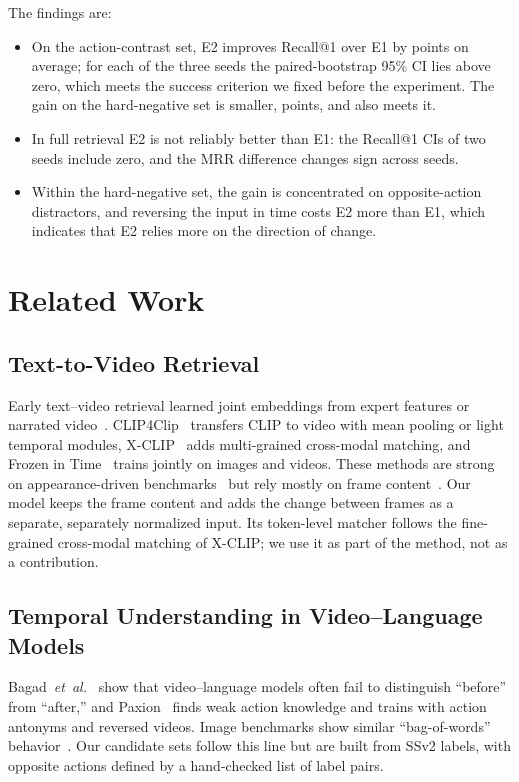 \documentclass[lettersize,journal]{IEEEtran}
\begin{document}
The findings are:
\begin{itemize}
\item On the action-contrast set, E2 improves Recall@1 over E1 by
  \DeltaAcRone{} points on average; for each of the three seeds the
  paired-bootstrap 95\% CI lies above zero, which meets the success criterion
  we fixed before the experiment. The gain on the hard-negative set is smaller,
  \DeltaHnRone{} points, and also meets it.
\item In full retrieval E2 is not reliably better than E1: the Recall@1
  CIs of two seeds include zero, and the MRR difference changes sign across
  seeds.
\item Within the hard-negative set, the gain is concentrated on opposite-action
  distractors, and reversing the input in time costs E2 more than E1, which
  indicates that E2 relies more on the direction of change.
\end{itemize}

\section{Related Work}
\subsection{Text-to-Video Retrieval}
Early text--video retrieval learned joint embeddings from expert features or
narrated video~\cite{miech2019howto100m,gabeur2020mmt}. CLIP4Clip~\cite{luo2022clip4clip}
transfers CLIP to video with mean pooling or light temporal modules,
X-CLIP~\cite{ma2022xclip} adds multi-grained cross-modal matching, and Frozen in
Time~\cite{bain2021frozen} trains jointly on images and videos. These methods
are strong on appearance-driven benchmarks~\cite{xu2016msrvtt} but rely mostly
on frame content~\cite{buch2022atp,lei2023singleframe}. Our model keeps the
frame content and adds the change between frames as a separate, separately
normalized input. Its token-level matcher follows the fine-grained cross-modal
matching of X-CLIP; we use it as part of the method, not as a contribution.

\subsection{Temporal Understanding in Video--Language Models}
Bagad~\textit{et~al.}~\cite{bagad2023testoftime} show that video--language
models often fail to distinguish ``before'' from ``after,'' and
Paxion~\cite{wang2023paxion} finds weak action knowledge and trains with
action antonyms and reversed videos. Image benchmarks show similar
``bag-of-words'' behavior~\cite{thrush2022winoground,yuksekgonul2023aro}. Our
candidate sets follow this line but are built from SSv2 labels, with opposite
actions defined by a hand-checked list of label pairs.
\end{document}
